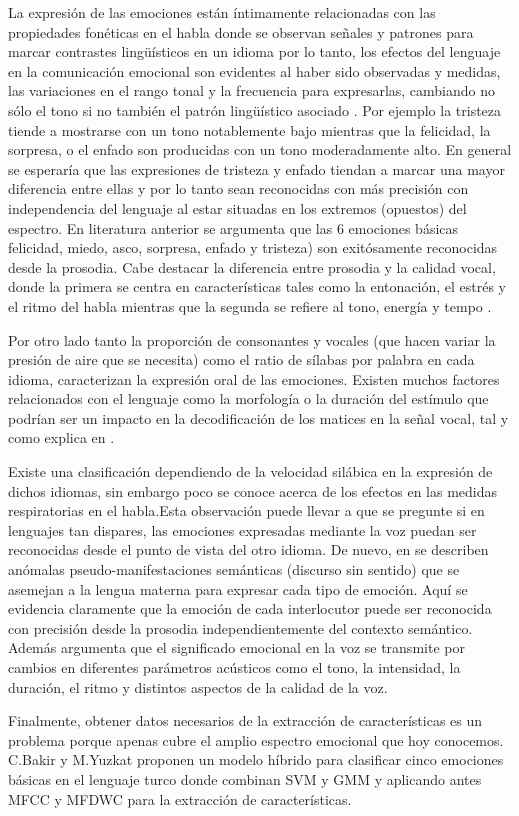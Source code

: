 \documentclass[11pt,a4paper,spanish]{book}
\begin{document}
	La expresión de las emociones están íntimamente relacionadas con las propiedades fonéticas en el habla donde se observan señales y patrones para marcar contrastes lingüísticos en un idioma \cite{Pell2001} por lo tanto, los efectos del lenguaje en la comunicación emocional son evidentes al haber sido observadas y medidas, las variaciones en el rango tonal y la frecuencia para expresarlas, cambiando no sólo el tono si no también el patrón lingüístico asociado \cite{Davletcharova2015}. Por ejemplo la tristeza tiende a mostrarse con un tono notablemente bajo mientras que la felicidad, la sorpresa, o el enfado son producidas con un tono moderadamente alto. En general se esperaría que las expresiones de tristeza y enfado tiendan a marcar una mayor diferencia entre ellas y por lo tanto sean reconocidas con más precisión con independencia del lenguaje al estar situadas en los extremos (opuestos) del espectro.
	En literatura anterior \cite{Pell2011} se argumenta que las 6 emociones básicas felicidad, miedo, asco, sorpresa, enfado y tristeza) son exitósamente reconocidas desde la prosodia. Cabe destacar la diferencia entre prosodia y la calidad vocal, donde la primera se centra en características tales como la entonación, el estrés y el ritmo del habla mientras que la segunda se refiere al tono, energía y tempo \cite{Processing2015} . 
	
	Por otro lado tanto la proporción de consonantes y vocales (que hacen variar la presión de aire que se necesita) como el ratio de sílabas por palabra en cada idioma, caracterizan la expresión oral de las emociones. Existen muchos factores relacionados con el lenguaje como la morfología o la duración del estímulo que podrían ser un impacto en la decodificación de los matices en la señal vocal, tal y como explica en \cite{Chen2017}.
	
	Existe una clasificación dependiendo de la velocidad silábica en la expresión de dichos idiomas, sin embargo poco se conoce acerca de los efectos en las medidas respiratorias en el habla.Esta observación puede llevar a que se pregunte si en lenguajes tan dispares, las emociones expresadas mediante la voz puedan ser reconocidas desde el punto de vista del otro idioma.
	De nuevo, en \cite{Pell2009} se describen anómalas pseudo-manifestaciones semánticas (discurso sin sentido) que se asemejan a la lengua materna para expresar cada tipo de emoción. Aquí se evidencia claramente que la emoción de cada interlocutor puede ser reconocida con precisión desde la prosodia independientemente del contexto semántico. Además argumenta que el significado emocional en la voz se transmite por cambios en diferentes parámetros acústicos como el tono, la intensidad, la duración, el ritmo y distintos aspectos de la calidad de la voz.
	
	Finalmente, obtener datos necesarios de la extracción de características es un problema porque apenas cubre el amplio espectro emocional que hoy conocemos. C.Bakir y M.Yuzkat \cite{BAKIR2018} proponen un modelo híbrido para clasificar cinco emociones básicas en el lenguaje turco donde combinan SVM y GMM y aplicando antes MFCC y MFDWC para la extracción de características.


	\printbibliography
\end{document}
